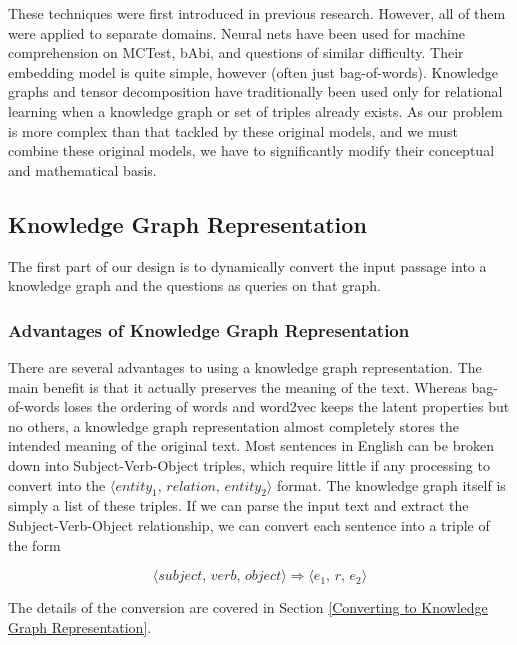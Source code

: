 \documentclass[pageno]{jpaper}
\begin{document}
These techniques were first introduced in previous research. However, all of
them were applied to separate domains. Neural nets have been used for machine
comprehension on MCTest, bAbi, and questions of similar difficulty. Their
embedding model is quite simple, however (often just bag-of-words). Knowledge
graphs and tensor decomposition have traditionally been used only for relational
learning when a knowledge graph or set of triples already exists. As our problem
is more complex than that tackled by these original models, and we must combine
these original models, we have to significantly modify their conceptual and
mathematical basis.

\subsection{Knowledge Graph Representation}
\label{Knowledge Graph Representation}

The first part of our design is to dynamically convert the input passage into a
knowledge graph and the questions as queries on that graph. \\

\subsubsection{Advantages of Knowledge Graph Representation}
\label{Advantages of Knowledge Graph Representation}

There are several advantages to using a knowledge graph representation. The main
benefit is that it actually preserves the meaning of the text. Whereas
bag-of-words loses the ordering of words and word2vec keeps the latent
properties but no others, a knowledge graph representation almost completely
stores the intended meaning of the original text. Most sentences in English can
be broken down into Subject-Verb-Object triples, which require little if any
processing to convert into the $\langle \textit{entity}_1, \, \textit{relation}, \,
\textit{entity}_2 \rangle$ format. The knowledge graph itself is simply a list of
these triples. If we can parse the input text and extract the
Subject-Verb-Object relationship, we can convert each sentence into a triple of
the form

$$\langle \textit{subject}, \, \textit{verb}, \, \textit{object} \rangle
\Rightarrow \langle e_1, \, r, \, e_2 \rangle$$

The details of the conversion are covered in Section \ref{Converting to
Knowledge Graph Representation}.
\end{document}
